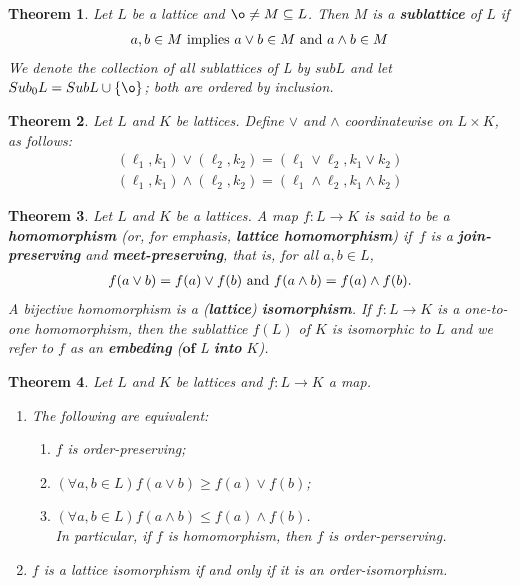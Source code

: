 \documentclass[a4paper,12pt,oneside]{report}%
\newtheorem{theorem}{Theorem}
\begin{document}
\begin{theorem}
Let $L$ be a lattice and $\o \neq M \subseteq L$. Then $M$ is a
    \textbf{sublattice} of $L$ if
    \begin{align*}
        a, b \in M \textnormal{ implies } a \vee b \in M \textnormal{ and }
        a \wedge b \in M
    \end{align*}
We denote the collection of all sublattices of L by $sub L$ and let
    $Sub_{0} L = Sub L \cup \lbrace \o \rbrace$; both are ordered by inclusion.
\end{theorem}

\begin{theorem}
Let $L$ and $K$ be lattices. Define $\vee$ and $\wedge$ coordinatewise on
    $L \times K$, as follows:
    \begin{align*}
        (\ell_{1}, k_{1}) \vee (\ell_{2}, k_{2}) =
            (\ell_{1} \vee \ell_{2}, k_{1} \vee k_{2}) \\
        (\ell_{1}, k_{1}) \wedge (\ell_{2}, k_{2}) =
            (\ell_{1} \wedge \ell_{2}, k_{1} \wedge k_{2})
    \end{align*}
\end{theorem}

\begin{theorem}
Let $L$ and $K$ be a lattices. A map $f: L \rightarrow K$ is said to be a
    \textbf{homomorphism} (or, for emphasis, \textbf{lattice homomorphism}) if\
    $f$ is a \textbf{join-preserving} and \textbf{meet-preserving}, that is,
    for all $a,b \in L$,
    \begin{align*}
        f(a \vee b) = f(a) \vee f(b) \textnormal{ and }
        f(a \wedge b) = f(a) \wedge f(b).
    \end{align*}
A bijective homomorphism is a (\textbf{lattice}) \textbf{isomorphism}. If
    $f: L \rightarrow K$ is a one-to-one homomorphism, then the sublattice
    $f(L)$ of $K$ is isomorphic to $L$ and we refer to $f$ as an
    \textbf{embeding} ($\textbf{of } $L$ $\textbf{ into } $K$).
\end{theorem}

\begin{theorem}
Let $L$ and $K$ be lattices and $f: L \rightarrow K$ a map.
    \begin{enumerate}[label=(\roman*)]
        \item The following are equivalent:
            \begin{enumerate}
                \item $f$ is order-preserving;
                \item $(\forall a,b \in L) f(a \vee b) \geq f(a) \vee f(b)$;
                \item $(\forall a,b \in L) f(a \wedge b) \leq f(a) \wedge f(b)$.
            \\ In particular, if $f$ is homomorphism, then $f$ is order-perserving.
            \end{enumerate}
        \item  $f$ is a lattice isomorphism if and only if it is an 
            order-isomorphism.
    \end{enumerate}
\end{theorem}
\end{document}
